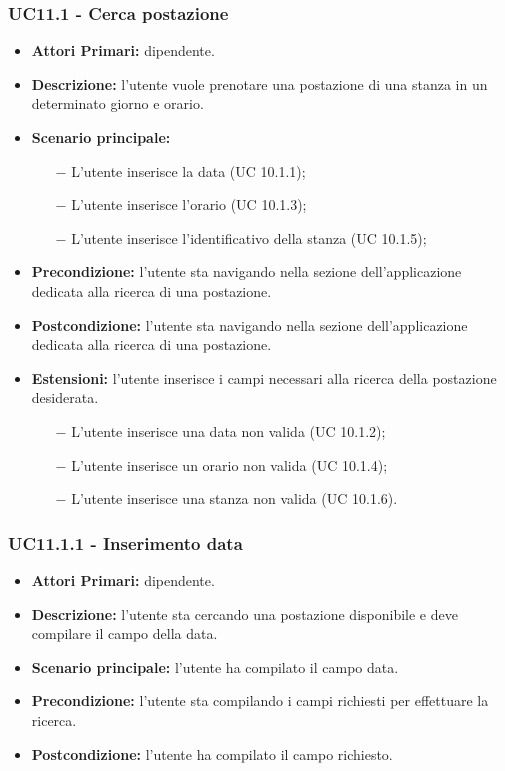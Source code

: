 \subsubsection{ UC11.1 - Cerca postazione}
\begin{itemize}
	\item\textbf{Attori Primari:} dipendente.
	\item\textbf{Descrizione:} l’utente vuole prenotare una postazione di una stanza in un determinato giorno e orario.
	\item\textbf{Scenario principale:} 
	\begin{itemize}
		\item[$-$] L’utente inserisce la data (UC 10.1.1);
		\item[$-$] L’utente inserisce l'orario (UC 10.1.3);
		\item[$-$] L’utente inserisce l'identificativo della stanza (UC 10.1.5);
	\end{itemize}
	\item\textbf{Precondizione:} l’utente sta navigando nella sezione dell'applicazione dedicata alla ricerca di una postazione.
	\item\textbf{Postcondizione:} l’utente sta navigando nella sezione dell'applicazione dedicata alla ricerca di una postazione.
	\item\textbf{Estensioni:} l’utente inserisce i campi necessari alla ricerca della postazione desiderata.
	\begin{itemize}
		\item[$-$] L’utente inserisce una data non valida (UC 10.1.2);
		\item[$-$] L’utente inserisce un orario non valida (UC 10.1.4);
		\item[$-$] L’utente inserisce una stanza non valida (UC 10.1.6).
	\end{itemize}
\end{itemize}
\subsubsection{ UC11.1.1 - Inserimento data }
\begin{itemize}
	\item\textbf{Attori Primari:} dipendente.
	\item\textbf{Descrizione:} l’utente sta cercando una postazione disponibile e deve compilare il campo della data.
	\item\textbf{Scenario principale:} l’utente ha compilato il campo data.
	\item\textbf{Precondizione:} l’utente sta compilando i campi richiesti per effettuare la ricerca.
	\item\textbf{Postcondizione:} l’utente ha compilato il campo richiesto.
\end{itemize}
